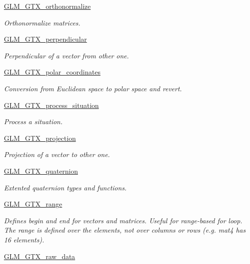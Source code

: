 \begin{DoxyCompactItemize}
\hyperlink{group__gtx__orthonormalize}{G\-L\-M\-\_\-\-G\-T\-X\-\_\-orthonormalize}
\begin{DoxyCompactList}\small\item\em Orthonormalize matrices. \end{DoxyCompactList}\item 
\hyperlink{group__gtx__perpendicular}{G\-L\-M\-\_\-\-G\-T\-X\-\_\-perpendicular}
\begin{DoxyCompactList}\small\item\em Perpendicular of a vector from other one. \end{DoxyCompactList}\item 
\hyperlink{group__gtx__polar__coordinates}{G\-L\-M\-\_\-\-G\-T\-X\-\_\-polar\-\_\-coordinates}
\begin{DoxyCompactList}\small\item\em Conversion from Euclidean space to polar space and revert. \end{DoxyCompactList}\item 
\hyperlink{group__gtx__process__situation}{G\-L\-M\-\_\-\-G\-T\-X\-\_\-process\-\_\-situation}
\begin{DoxyCompactList}\small\item\em Process a situation. \end{DoxyCompactList}\item 
\hyperlink{group__gtx__projection}{G\-L\-M\-\_\-\-G\-T\-X\-\_\-projection}
\begin{DoxyCompactList}\small\item\em Projection of a vector to other one. \end{DoxyCompactList}\item 
\hyperlink{group__gtx__quaternion}{G\-L\-M\-\_\-\-G\-T\-X\-\_\-quaternion}
\begin{DoxyCompactList}\small\item\em Extented quaternion types and functions. \end{DoxyCompactList}\item 
\hyperlink{group__gtx__range}{G\-L\-M\-\_\-\-G\-T\-X\-\_\-range}
\begin{DoxyCompactList}\small\item\em Defines begin and end for vectors and matrices. Useful for range-\/based for loop. The range is defined over the elements, not over columns or rows (e.\-g. mat4 has 16 elements). \end{DoxyCompactList}\item 
\hyperlink{group__gtx__raw__data}{G\-L\-M\-\_\-\-G\-T\-X\-\_\-raw\-\_\-data}

\end{DoxyCompactItemize}

